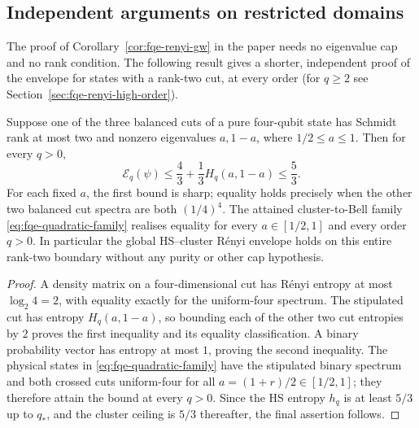 \subsection{Independent arguments on restricted domains}\label{sec:fqe-renyi-restricted}
The proof of Corollary~\ref{cor:fqe-renyi-gw} in the paper needs no eigenvalue cap and no rank condition. The following result gives a shorter,
independent proof of the envelope for states with a rank-two cut, at every order (for $q\ge2$ see
Section~\ref{sec:fqe-renyi-high-order}).

\begin{proposition}
\label{prop:fqe-renyi-rank-two}
Suppose one of the three balanced cuts of a pure four-qubit state has
Schmidt rank at most two and nonzero eigenvalues $a,1-a$,
where $1/2\le a\le1$. Then for every $q>0$,
\[
\boxed{\qquad
\mathcal E_q(\psi)\le
\frac43+\frac{1}{3}H_q(a,1-a)
\le\frac53.\qquad}
\tag{Rk2}\label{eq:fqe-renyi-rank-two}
\]
For each fixed $a$, the first bound is sharp; equality holds precisely
when the other two balanced cut spectra are both $(1/4)^4$.
The attained cluster-to-Bell family \eqref{eq:fqe-quadratic-family}
realises equality for every $a\in[1/2,1]$ and every order $q>0$.
In particular the global HS--cluster R\'enyi envelope holds on
this entire rank-two boundary without any purity or other cap hypothesis.
\end{proposition}
\begin{proof}
A density matrix on a four-dimensional cut has R\'enyi entropy
at most $\log_2 4=2$, with equality exactly for the uniform-four
spectrum. The stipulated cut has entropy $H_q(a,1-a)$, so bounding
each of the other two cut entropies by $2$ proves the first
inequality and its equality classification. A binary probability
vector has entropy at most $1$, proving the second inequality.
The physical states in \eqref{eq:fqe-quadratic-family} have the
stipulated binary spectrum and both crossed cuts uniform-four
for all $a=(1+r)/2\in[1/2,1]$; they therefore attain the bound
at every $q>0$. Since the HS entropy $h_q$ is at least $5/3$
up to $q_*$, and the cluster ceiling is $5/3$ thereafter,
the final assertion follows.
\end{proof}

